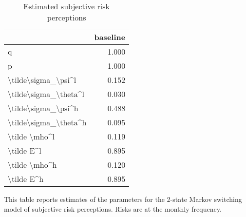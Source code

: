 
\begin{table}[p]
\centering
\begin{adjustbox}{width=0.3\textwidth}
\begin{threeparttable}
\caption{Estimated subjective risk perceptions}
\label{tab:PRMarkovEst}\begin{tabular}{lr}
\toprule
{} &  baseline \\
\midrule
q                     &     1.000 \\
p                     &     1.000 \\
\textbackslash tilde\textbackslash sigma\_\textbackslash psi\textasciicircum l   &     0.152 \\
\textbackslash tilde\textbackslash sigma\_\textbackslash theta\textasciicircum l &     0.030 \\
\textbackslash tilde\textbackslash sigma\_\textbackslash psi\textasciicircum h   &     0.488 \\
\textbackslash tilde\textbackslash sigma\_\textbackslash theta\textasciicircum h &     0.095 \\
\textbackslash tilde \textbackslash mho\textasciicircum l         &     0.119 \\
\textbackslash tilde E\textasciicircum l            &     0.895 \\
\textbackslash tilde \textbackslash mho\textasciicircum h         &     0.120 \\
\textbackslash tilde E\textasciicircum h            &     0.895 \\
\bottomrule
\end{tabular}
\begin{tablenotes}\item This table reports estimates of the parameters 
for the 2-state Markov switching model of subjective risk perceptions. Risks are at the monthly frequency. 
\end{tablenotes}
\end{threeparttable}
\end{adjustbox}
\end{table}